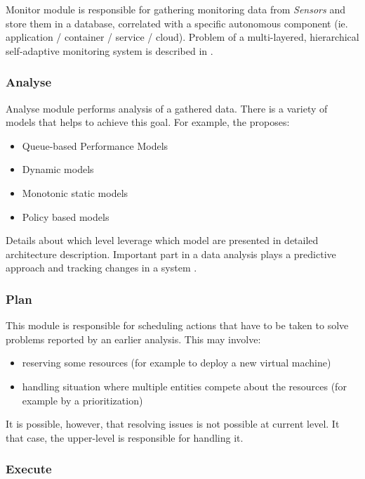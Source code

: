 Monitor module is responsible for gathering monitoring data from \textit{Sensors} and store them in a database, correlated with a specific autonomous component (ie. application / container / service / cloud). Problem of a multi-layered, hierarchical self-adaptive monitoring system is described in \cite{KaKoGoKyMeVa12}.


\subsubsection{Analyse}

Analyse module performs analysis of a gathered data. There is a variety of models that helps to achieve this goal. For example, the \cite{LiWoZh05} proposes:

\begin{itemize}
	\item Queue-based Performance Models
	\item Dynamic models
	\item Monotonic static models
	\item Policy based models
\end{itemize}

Details about which level leverage which model are presented in detailed architecture description. Important part in a data analysis plays a predictive approach \cite{JiPeLiCh11} and tracking changes in a system \cite{ZhYaWo05}.

\subsubsection{Plan}

This module is responsible for scheduling actions that have to be taken to solve problems reported by an earlier analysis. This may involve:
\begin{itemize}
	\item reserving some resources (for example to deploy a new virtual machine)
	\item handling situation where multiple entities compete about the resources (for example by a prioritization)
\end{itemize}

It is possible, however, that resolving issues is not possible at current level. It that case, the upper-level is responsible for handling it.

\subsubsection{Execute}


